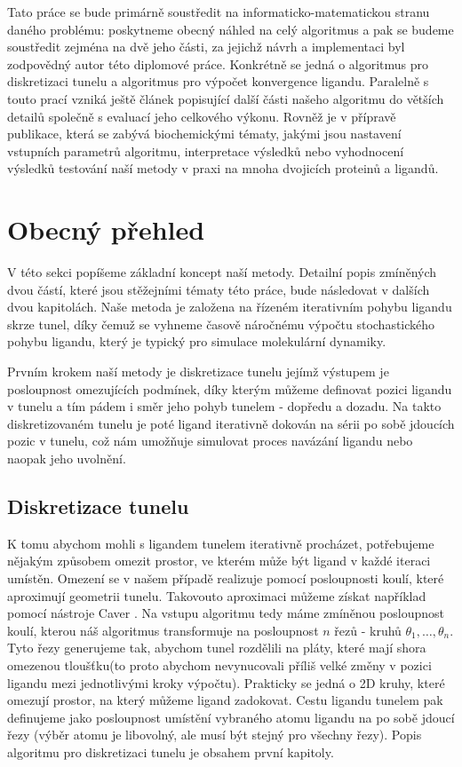 Tato práce se bude primárně soustředit na informaticko-matematickou stranu
daného problému: poskytneme obecný náhled na celý algoritmus a pak se budeme
soustředit zejména na dvě jeho části, za jejichž návrh a implementaci byl
zodpovědný autor této diplomové práce. Konkrétně se jedná o algoritmus pro
diskretizaci tunelu a algoritmus pro výpočet konvergence ligandu. Paralelně
s touto prací vzniká ještě článek popisující další části našeho algoritmu
do větších detailů společně s evaluací jeho celkového výkonu. Rovněž je v přípravě
publikace, která se zabývá biochemickými tématy, jakými jsou nastavení
vstupních parametrů algoritmu, interpretace výsledků nebo vyhodnocení výsledků
testování naší metody v praxi na mnoha dvojicích proteinů a ligandů.





\section{Obecný přehled}
V této sekci popíšeme základní koncept naší metody. Detailní popis zmíněných
dvou částí, které jsou stěžejními tématy této práce, bude následovat v dalších
dvou kapitolách. Naše metoda je založena na řízeném iterativním pohybu ligandu
skrze tunel, díky čemuž se vyhneme časově náročnému výpočtu stochastického
pohybu ligandu, který je typický pro simulace molekulární dynamiky.

Prvním krokem naší metody je diskretizace tunelu jejímž výstupem je posloupnost
omezujících podmínek, díky kterým můžeme definovat pozici ligandu v tunelu a
tím pádem i směr jeho pohyb tunelem - dopředu a dozadu. Na takto diskretizovaném
tunelu je poté ligand iterativně dokován na sérii po sobě jdoucích pozic v tunelu,
což nám umožňuje simulovat proces navázání ligandu nebo naopak jeho uvolnění.





\subsection{Diskretizace tunelu}
K tomu abychom mohli s ligandem tunelem iterativně procházet, potřebujeme nějakým
způsobem omezit prostor, ve kterém může být ligand v každé iteraci umístěn.
Omezení se v našem případě realizuje pomocí posloupnosti koulí, které aproximují
geometrii tunelu. Takovouto aproximaci můžeme získat například pomocí nástroje
Caver \cite{Caver}. Na vstupu algoritmu tedy máme zmíněnou posloupnost
koulí, kterou náš algoritmus transformuje na posloupnost $ n $ řezů - kruhů
$ \theta_1, \dots, \theta_n $. Tyto řezy generujeme tak, abychom tunel rozdělili
na pláty, které mají shora omezenou tloušťku(to proto abychom nevynucovali
příliš velké změny v pozici ligandu mezi jednotlivými kroky výpočtu). Prakticky
se jedná o 2D kruhy, které omezují prostor, na který můžeme ligand zadokovat.
Cestu ligandu tunelem pak definujeme jako posloupnost umístění vybraného atomu
ligandu na po sobě jdoucí řezy (výběr atomu je libovolný, ale musí být stejný
pro všechny řezy). Popis algoritmu pro diskretizaci tunelu je obsahem první kapitoly.

